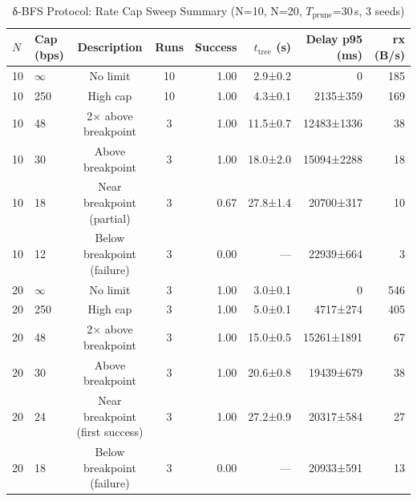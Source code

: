 \begin{table}[ht]
\centering
\caption{δ-BFS Protocol: Rate Cap Sweep Summary (N=10, N=20, $T_\text{prune}$=30\,s, 3 seeds)}
\label{tab:rate_cap_sweep}
\begin{tabular}{llccrrrr}
\toprule
$N$ & Cap (bps) & Description & Runs & Success & $t_\text{tree}$ (s) & Delay p95 (ms) & rx (B/s) \\
\midrule
10 & $\infty$ & No limit & 10 & 1.00 & 2.9±0.2 & 0 & 185 \\
10 & 250 & High cap & 10 & 1.00 & 4.3±0.1 & 2135±359 & 169 \\
10 & 48 & 2× above breakpoint & 3 & 1.00 & 11.5±0.7 & 12483±1336 & 38 \\
10 & 30 & Above breakpoint & 3 & 1.00 & 18.0±2.0 & 15094±2288 & 18 \\
10 & 18 & Near breakpoint (partial) & 3 & 0.67 & 27.8±1.4 & 20700±317 & 10 \\
10 & 12 & Below breakpoint (failure) & 3 & 0.00 & — & 22939±664 & 3 \\
\midrule
20 & $\infty$ & No limit & 3 & 1.00 & 3.0±0.1 & 0 & 546 \\
20 & 250 & High cap & 3 & 1.00 & 5.0±0.1 & 4717±274 & 405 \\
20 & 48 & 2× above breakpoint & 3 & 1.00 & 15.0±0.5 & 15261±1891 & 67 \\
20 & 30 & Above breakpoint & 3 & 1.00 & 20.6±0.8 & 19439±679 & 38 \\
20 & 24 & Near breakpoint (first success) & 3 & 1.00 & 27.2±0.9 & 20317±584 & 27 \\
20 & 18 & Below breakpoint (failure) & 3 & 0.00 & — & 20933±591 & 13 \\
\bottomrule
\end{tabular}
\end{table}